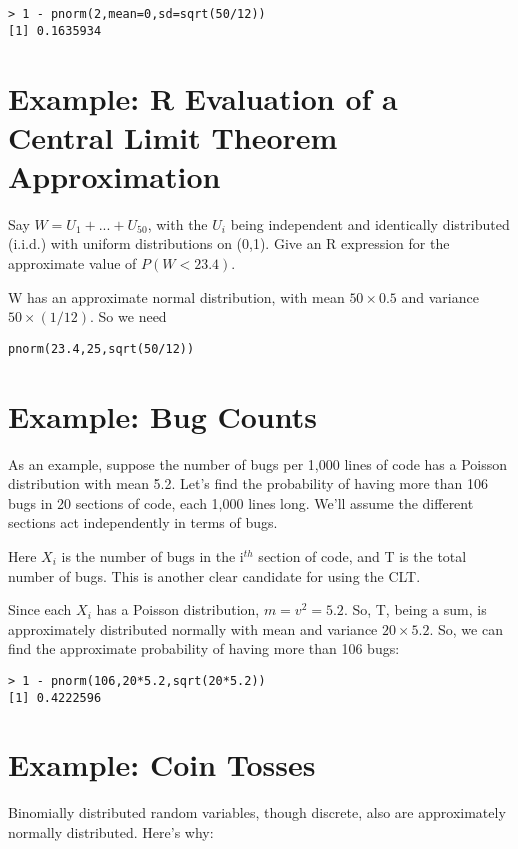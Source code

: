 \begin{lstlisting}
> 1 - pnorm(2,mean=0,sd=sqrt(50/12))
[1] 0.1635934
\end{lstlisting}

\section{Example:  R Evaluation of a Central Limit Theorem
Approximation}

Say $W = U_1 + ... + U_{50}$, with the $U_i$ being independent and
identically distributed (i.i.d.) with uniform distributions on (0,1).
Give an R expression for the approximate value of $P(W < 23.4)$.

W has an approximate normal distribution, with mean $50 \times
0.5$ and variance $50 \times (1/12)$.  So we need

\begin{lstlisting}
pnorm(23.4,25,sqrt(50/12))
\end{lstlisting}

\section{Example:  Bug Counts}

As an example, suppose the number of bugs per 1,000 lines of code has a
Poisson distribution with mean 5.2.  Let's find the probability of
having more than 106 bugs in 20 sections of code, each 1,000 lines long.
We'll assume the different sections act independently in terms of bugs.

Here $X_i$ is the number of bugs in the i$^{th}$ section of code, and T
is the total number of bugs.  This is another clear candidate for using
the CLT.

Since each $X_i$ has a Poisson distribution, $m = v^2 = 5.2$.  So, T,
being a sum, is approximately distributed normally with mean and
variance $20 \times 5.2$.  So, we can find the approximate probability
of having more than 106 bugs:

\begin{Verbatim}[fontsize=\relsize{-2}]
> 1 - pnorm(106,20*5.2,sqrt(20*5.2))
[1] 0.4222596
\end{Verbatim}

\section{Example:  Coin Tosses}
\label{correctcontin}

Binomially distributed random variables, though discrete, also are
approximately normally distributed.  Here's why:

